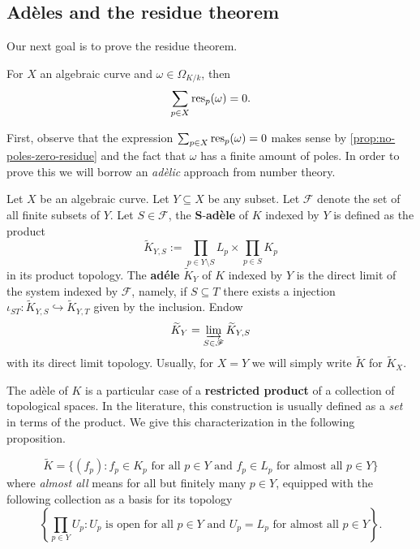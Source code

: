 \subsection*{Adèles and the residue theorem}
Our next goal is to prove the residue theorem.
\begin{theorem}\label{thm:residue-theorem}
	For $X$ an algebraic curve and $\omega \in \Omega_{K/k}$, then 
	\[
		\sum_{p\in X}\operatorname{res}_{p}(\omega) = 0.
	\]
\end{theorem}
First, observe that the expression $\sum_{p\in X}\operatorname{res}_{p}(\omega) = 0$ makes sense by \cref{prop:no-poles-zero-residue} and the fact that $\omega$ has a finite amount of poles. In order to prove this we will borrow an \textit{adèlic} approach from number theory.
\begin{definition}\label{def:adele-ring-over-algebraic-curve}
	Let $X$ be an algebraic curve. Let $Y \subseteq X$ be any subset. Let $\mathscr{F}$ denote the set of all finite subsets of $Y$. Let $S \in \mathscr{F}$, the $\mathbf{S}$-\textbf{adèle} of $K$ indexed by $Y$ is defined as the product
	\[
		\widetilde{K}_{Y,S} := \prod_{p\in Y\setminus S}L_{p} \times \prod_{p\in S}K_{p}
	\]
	in its product topology. The \textbf{adéle} $\widetilde{K}_{Y}$ of $K$ indexed by $Y$ is the direct limit of the system indexed by $\mathscr{F}$, namely, if $S \subseteq T$ there exists a injection $\iota_{ST}\colon \widetilde{K}_{Y,S} \hookrightarrow \widetilde{K}_{Y,T}$ given by the inclusion. Endow
	\[
		\widetilde{K}_{Y} = \varinjlim_{S \in \mathscr{F}} \widetilde{K}_{Y,S}
	\]
	with its direct limit topology. Usually, for $X = Y$ we will simply write $\widetilde{K}$ for $\widetilde{K}_{X}$.
\end{definition}
The adèle of $K$ is a particular case of a \textbf{restricted product} of a collection of topological spaces. In the literature, this construction is usually defined as a \textit{set} in terms of the product. We give this characterization in the following proposition.
\begin{proposition}\label{prop:adèle-as-subset-of-product}
	\[
		\widetilde{K} = \{(f_{p})\colon f_{p} \in K_{p}\text{ for all }p \in Y\text{ and }f_{p}\in L_{p}\text{ for almost all }p\in Y\}
	\]
	where \textit{almost all} means for all but finitely many $p\in Y$, equipped with the following collection as a basis for its topology
	\[
		\left\{\prod_{p\in Y} U_{p} \colon U_{p}\text{ is open for all }p\in Y\text{ and }U_{p} = L_{p}\text{ for almost all }p\in Y\right\}.
	\]
\end{proposition}
